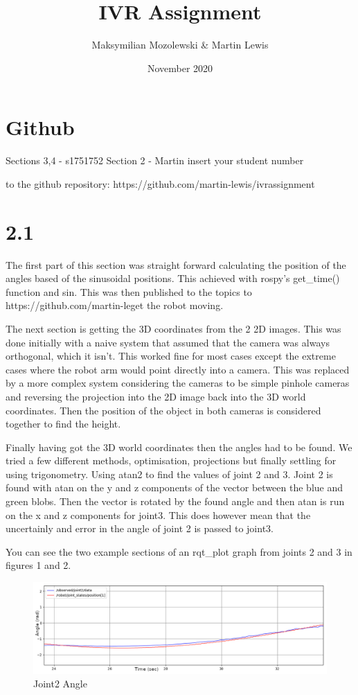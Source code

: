 \documentclass[11pt]{report}
\title{IVR Assignment}
\author{Maksymilian Mozolewski \& Martin Lewis}
\date{November 2020}
\begin{document}

\section*{Github}
Sections 3,4 - s1751752
Section 2 - \<Martin insert your student number\>

\noindLink to the github repository:  https://github.com/martin-lewis/ivrassignment

\section*{2.1}

The first part of this section was straight forward calculating the position of the angles based of the sinusoidal positions. This achieved with rospy's get\_time() function and sin.
This was then published to the topics to 
\noindent https://github.com/martin-leget the robot moving.

The next section is getting the 3D coordinates from the 2 2D images. This was done initially with a naive system that assumed that the camera was always orthogonal,
which it isn't. This worked fine for most cases except the extreme cases where the robot arm would point directly into a camera. This was replaced by a more complex
system considering the cameras to be simple pinhole cameras and reversing the projection into the 2D image back into the 3D world coordinates. Then the position
of the object in both cameras is considered together to find the height.

Finally having got the 3D world coordinates then the angles had to be found. We tried a few different methods, optimisation, projections but finally settling for using trigonometry. Using atan2 to find the values of
joint 2 and 3. Joint 2 is found with atan on the y and z components of the vector between the blue and green blobs. Then the vector is rotated by the found angle
and then atan is run on the x and z components for joint3. This does however mean that the uncertainly and error in the angle of joint 2 is passed to joint3.

You can see the two example sections of an rqt\_plot graph from joints 2 and 3 in figures 1 and 2.
\begin{figure}[H]
    \includegraphics[width=\linewidth]{joint2.png}
    \caption{Joint2 Angle}
\end{figure}
\end{document}
